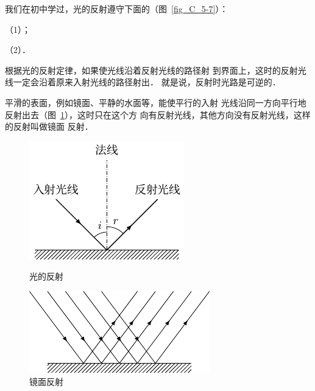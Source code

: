 我们在初中学过，光的反射遵守下面的（图~\ref{fig_C_5-7}）：


（1）；

（2）．


根据光的反射定律，如果使光线沿着反射光线的路径射
到界面上，这时的反射光线一定会沿着原来入射光线的路径射出．
就是说，反射时光路是可逆的．

平滑的表面，例如镜面、平静的水面等，能使平行的入射
光线沿同一方向平行地反射出去（图~\ref{fig_C_5-8}），这时只在这个方
向有反射光线，其他方向没有反射光线，这样的反射叫做镜面
反射．
\begin{figure}[htbp]
    \centering
    \begin{minipage}[t]{0.48\textwidth}
        \centering
        \includegraphics{fig/C/5-7.pdf}
        \caption{光的反射}\label{fig_C_5-7}
    \end{minipage}
    \begin{minipage}[t]{0.48\textwidth}
        \centering
        \includegraphics{fig/C/5-8.pdf}
        \caption{镜面反射}\label{fig_C_5-8}
    \end{minipage}
\end{figure}


